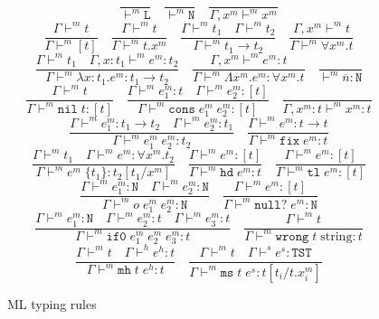 \begin{figure}[p]
\[
\frac{}{\vdash^m\mathtt{L}}
\quad
\frac{}{\vdash^m\mathtt{\mathtt{N}}}
\quad
\frac{}{\Gamma,x^m\vdash^mx^m}
\]
\[
\frac{\Gamma\vdash^mt}{\Gamma\vdash^m[t]}
\quad
\frac{\Gamma\vdash^mt}{\Gamma\vdash^mt.x^m}
\quad
\frac{\Gamma\vdash^mt_{1}\quad\Gamma\vdash^mt_{2}}{\Gamma\vdash^mt_{1}\rightarrow t_{2}}
\quad
\frac{\Gamma ,x^m\vdash^mt}{\Gamma\vdash^m\forall x^m.t}
\]
\bigskip
\[
\frac{\Gamma\vdash^mt_{1}\quad\Gamma,x:t_{1}\vdash^me^m:t_{2}}{\Gamma\vdash^m\lambda x:t_{1}.e^m:t_{1}\rightarrow t_{2}}
\quad
\frac{\Gamma,x^m\vdash^me^m:t}{\Gamma\vdash^m\Lambda x^m.e^m:\forall x^m.t}
\quad
\frac{}{\vdash^m\overline{n}:\mathtt{N}}
\]
\[
\frac{\Gamma\vdash^mt}{\Gamma\vdash^m\mathtt{nil}\;t:[t]}
\quad
\frac{\Gamma\vdash^me^m_1:t\quad\Gamma\vdash^me^m_2:[t]}{\Gamma\vdash^m\mathtt{cons}\;e^m_1\;e^m_2:[t]}
\quad
\frac{}{\Gamma,x^m:t\vdash^mx^m:t}
\]
\[
\frac{\Gamma\vdash^me^m_1:t_{1}\rightarrow t_{2}\quad\Gamma\vdash^me^m_2:t_{1}}{\Gamma\vdash^me^m_1\;e^m_2:t_{2}}
\quad
\frac{\Gamma\vdash^me^m:t\rightarrow t}{\Gamma\vdash^m\mathtt{fix}\;e^m:t}
\]
\[
\frac{\Gamma\vdash^mt_{1}\quad\Gamma\vdash^me^m:\forall x^m.t_{2}}{\Gamma\vdash^me^m\;\lbrace t_{1}\rbrace:t_{2}[t_{1}/x^m]}
\quad
\frac{\Gamma\vdash^me^m:[t]}{\Gamma\vdash^m\mathtt{hd}\;e^m:t}
\quad
\frac{\Gamma\vdash^me^m:[t]}{\Gamma\vdash^m\mathtt{tl}\;e^m:[t]}
\]
\[
\frac{\Gamma\vdash^me^m_1:\mathtt{N}\quad\Gamma\vdash^me^m_2:\mathtt{N}}{\Gamma\vdash^mo\;e^m_1\;e^m_2:\mathtt{N}}
\quad
\frac{\Gamma\vdash^me^m:[t]}{\Gamma\vdash^m\mathtt{null?}\;e^m:\mathtt{N}}
\]
\[
\frac{\Gamma\vdash^me^m_1:\mathtt{N}\quad\Gamma\vdash^me^m_2:t\quad\Gamma\vdash^me^m_3:t}{\Gamma\vdash^m\mathtt{if0}\;e^m_1\;e^m_2\;e^m_3:t}
\quad
\frac{\Gamma\vdash^mt}{\Gamma\vdash^m\mathtt{wrong}\;t\;\mathrm{string}:t}
\]
\[
\frac{\Gamma\vdash^mt\quad\Gamma\vdash^he^h:t}{\Gamma\vdash^m\mathtt{mh}\;t\;e^h:t}
\quad
\frac{\Gamma\vdash^mt\quad\Gamma\vdash^se^s:\mathtt{TST}}{\Gamma\vdash^m\mathtt{ms}\;t\;e^s:t[t_{i}/t.x^m_{i}]}
\]
\caption{ML typing rules}
\label{mtr}
\end{figure}